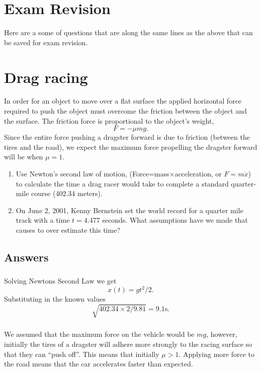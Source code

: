 \documentclass[10pt]{article}
\newcommand{\bb}{\begin{equation}}
\newcommand{\ee}{\end{equation}}
\begin{document}
\section*{Exam Revision}
Here are a some of questions that are along the same lines as the above that can be saved for exam revision.
\section{Drag racing}
In order for an object to move over a flat surface the applied horizontal force required to push the object must overcome the friction between the object and the surface. The friction force is proportional to the object's weight,
\bb
F=-\mu mg.
\ee
Since the entire force pushing a dragster forward is due to friction (between the tires and the road), we expect the maximum force propelling the dragster forward will be when $\mu=1$.
\begin{enumerate}
\item Use Newton's second law of motion, (Force=mass$\times$acceleration, or $F=m\ddot{x}$) to calculate the time a drag racer would take to complete a standard quarter-mile
course (402.34 meters).
\item On June 2, 2001, Kenny Bernstein set the world record for a
quarter mile track with a time $t = 4.477$ seconds. What assumptions have we made that causes to over estimate this time?
\end{enumerate}
\begin{Answ}
\subsection{Answers}
\subsubsection{}
Solving Newtons Second Law we get
\bb
x(t)=gt^2/2.
\ee
Substituting in the known values
\bb
\sqrt{402.34\times 2/9.81}= 9.1 \textrm{s}.
\ee
\subsubsection{}
We assumed that the maximum force on the vehicle would be $mg$, however, initially the tires of a dragster will adhere more strongly to the racing surface so that they can ``push off''. This means that initially $\mu>1$. Applying more force to the road means that the car accelerates faster than expected.
\end{Answ}
\end{document}
